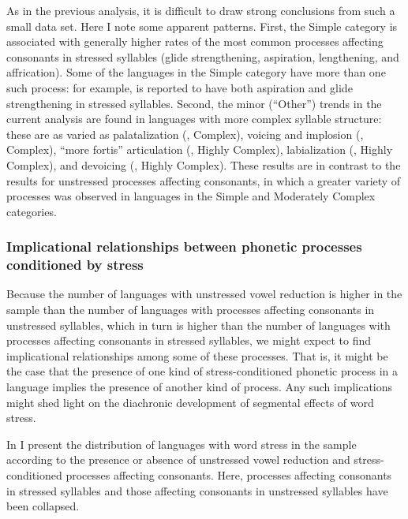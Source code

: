   As in the previous analysis, it is difficult to draw strong conclusions from such a small data set. Here I note some apparent patterns. First, the Simple category is associated with generally higher rates of the most common processes affecting consonants in stressed syllables (glide strengthening, aspiration, lengthening, and affrication). Some of the languages in the Simple category have more than one such process: for example,  is reported to have both aspiration and glide strengthening in stressed syllables. Second, the minor (``Other'') trends in the current analysis are found in languages with more complex syllable structure: these are as varied as palatalization (, Complex), voicing and implosion (, Complex), ``more fortis'' articulation (, Highly Complex), labialization (, Highly Complex), and devoicing (, Highly Complex). These results are in contrast to the results for unstressed processes affecting consonants, in which a greater variety of processes was observed in languages in the Simple and Moderately Complex categories.

\subsubsection{{Implicational} {relationships} {between} {phonetic} {processes} {conditioned} {by} {stress}}\label{sec:5.4.3.4}

  Because the number of languages with unstressed vowel reduction is higher in the sample than the number of languages with processes affecting consonants in unstressed syllables, which in turn is higher than the number of languages with processes affecting consonants in stressed syllables, we might expect to find implicational relationships among some of these processes. That is, it might be the case that the presence of one kind of stress-conditioned phonetic process in a language implies the presence of another kind of process. Any such implications might shed light on the diachronic development of segmental effects of word stress.

  In  I present the distribution of languages with word stress in the sample according to the presence or absence of unstressed vowel reduction and stress-conditioned processes affecting consonants. Here, processes affecting consonants in stressed syllables and those affecting consonants in unstressed syllables have been collapsed.

